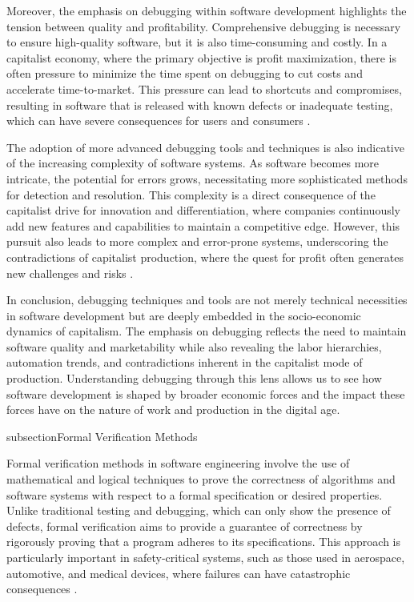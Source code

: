 \begin{refsection}
Moreover, the emphasis on debugging within software development highlights the tension between quality and profitability. Comprehensive debugging is necessary to ensure high-quality software, but it is also time-consuming and costly. In a capitalist economy, where the primary objective is profit maximization, there is often pressure to minimize the time spent on debugging to cut costs and accelerate time-to-market. This pressure can lead to shortcuts and compromises, resulting in software that is released with known defects or inadequate testing, which can have severe consequences for users and consumers \cite[pp.~115-120]{kaner1999testing}.

The adoption of more advanced debugging tools and techniques is also indicative of the increasing complexity of software systems. As software becomes more intricate, the potential for errors grows, necessitating more sophisticated methods for detection and resolution. This complexity is a direct consequence of the capitalist drive for innovation and differentiation, where companies continuously add new features and capabilities to maintain a competitive edge. However, this pursuit also leads to more complex and error-prone systems, underscoring the contradictions of capitalist production, where the quest for profit often generates new challenges and risks \cite[pp.~250-255]{marx2008capital}.

In conclusion, debugging techniques and tools are not merely technical necessities in software development but are deeply embedded in the socio-economic dynamics of capitalism. The emphasis on debugging reflects the need to maintain software quality and marketability while also revealing the labor hierarchies, automation trends, and contradictions inherent in the capitalist mode of production. Understanding debugging through this lens allows us to see how software development is shaped by broader economic forces and the impact these forces have on the nature of work and production in the digital age.\

subsection{Formal Verification Methods}

Formal verification methods in software engineering involve the use of mathematical and logical techniques to prove the correctness of algorithms and software systems with respect to a formal specification or desired properties. Unlike traditional testing and debugging, which can only show the presence of defects, formal verification aims to provide a guarantee of correctness by rigorously proving that a program adheres to its specifications. This approach is particularly important in safety-critical systems, such as those used in aerospace, automotive, and medical devices, where failures can have catastrophic consequences \cite[pp.~1-4]{clarke2018model}.


\end{refsection}
